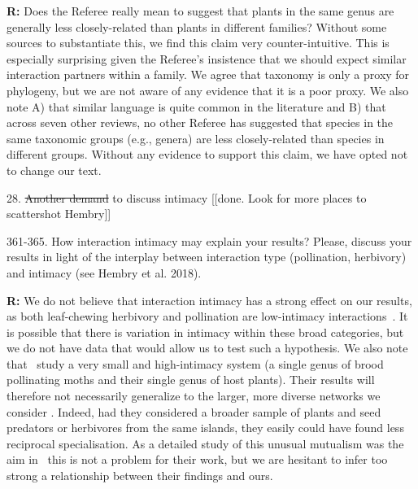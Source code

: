 \documentclass[12pt]{letter}
\newenvironment{refquote}{\bigskip \begin{it}}{\end{it}\smallskip}
\providecommand{\DIFadd}[1]{{\protect\color{blue}\uwave{#1}}} %
\providecommand{\DIFdel}[1]{{\protect\color{red}\sout{#1}}}                      %
\providecommand{\DIFaddbegin}{} %
\providecommand{\DIFaddend}{} %
\providecommand{\DIFdelbegin}{} %
\providecommand{\DIFdelend}{} %
\newcommand{\DIFscaledelfig}{0.5}
\newlength{\DIFdelgraphicswidth} %
\newlength{\DIFdelgraphicsheight} %
\newcommand{\DIFaddincludegraphics}[2][]{{\color{blue}\fbox{\DIFOincludegraphics[#1]{#2}}}} %
\newcommand{\DIFdelincludegraphics}[2][]{%
\sbox{\DIFdelgraphicsbox}{\DIFOincludegraphics[#1]{#2}}%
\settoboxwidth{\DIFdelgraphicswidth}{\DIFdelgraphicsbox} %
\settoboxtotalheight{\DIFdelgraphicsheight}{\DIFdelgraphicsbox} %
\scalebox{\DIFscaledelfig}{%
\parbox[b]{\DIFdelgraphicswidth}{\usebox{\DIFdelgraphicsbox}\\[-\baselineskip] \rule{\DIFdelgraphicswidth}{0em}}\llap{\resizebox{\DIFdelgraphicswidth}{\DIFdelgraphicsheight}{%
\setlength{\unitlength}{\DIFdelgraphicswidth}%
\begin{picture}(1,1)%
\thicklines\linethickness{2pt} %
{\color[rgb]{1,0,0}\put(0,0){\framebox(1,1){}}}%
{\color[rgb]{1,0,0}\put(0,0){\line( 1,1){1}}}%
{\color[rgb]{1,0,0}\put(0,1){\line(1,-1){1}}}%
\end{picture}%
}\hspace*{3pt}}} %
} %
\DeclareRobustCommand{\DIFaddbegin}{\DIFOaddbegin \let\includegraphics\DIFaddincludegraphics} %
\DeclareRobustCommand{\DIFaddend}{\DIFOaddend \let\includegraphics\DIFOincludegraphics} %
\DeclareRobustCommand{\DIFdelbegin}{\DIFOdelbegin \let\includegraphics\DIFdelincludegraphics} %
\DeclareRobustCommand{\DIFdelend}{\DIFOaddend \let\includegraphics\DIFOincludegraphics} %
\begin{document}

\DIFaddbegin 

		\DIFaddend \textbf{R:} Does the Referee really mean to suggest that plants in the same genus are generally less closely-related than plants in different families? Without some sources to substantiate this, we find this claim very counter-intuitive. This is especially surprising given the Referee's insistence that we should expect similar interaction partners within a family. We agree that taxonomy is only a proxy for phylogeny, but we are not aware of any evidence that it is a poor proxy. We also note A) that similar language is quite common in the literature and B) that across seven other reviews, no other Referee has suggested that species in the same taxonomic groups (e.g., genera) are less closely-related than species in different groups. Without any evidence to support this claim, we have opted not to change our text.


	28. \DIFdelbegin \DIFdel{Another demand }\DIFdelend \DIFaddbegin \DIFadd{Request }\DIFaddend to discuss intimacy [[done. Look for more places to scattershot Hembry]]

		\begin{refquote}
			361-365. How interaction intimacy may explain your results? Please, discuss your results in light of the interplay between interaction type (pollination, herbivory) and intimacy (see Hembry et al. 2018).
		\end{refquote}


		\textbf{R:} We do not believe that interaction intimacy has a strong effect on our results, as both leaf-chewing herbivory and pollination are low-intimacy interactions~\citep{Astegiano2017}. It is possible that there is variation in intimacy within these broad categories, but we \DIFaddbegin \DIFadd{unfortunately }\DIFaddend do not have data that would allow us to test such a hypothesis. We also note that~\citet{Hembry2018} study a very small and high-intimacy system (a single genus of brood pollinating moths and their single genus of host plants). Their results will therefore not necessarily generalize to the larger, more diverse networks we consider \DIFaddbegin \DIFadd{here}\DIFaddend . Indeed, had they considered a broader sample of plants and seed predators or herbivores from the same islands, they easily could have found less reciprocal specialisation. As a detailed study of this unusual mutualism was the aim in~\citet{Hembry2018} this is not a problem for their work, but we are hesitant to infer too strong a relationship between their findings and ours.
\end{document}
